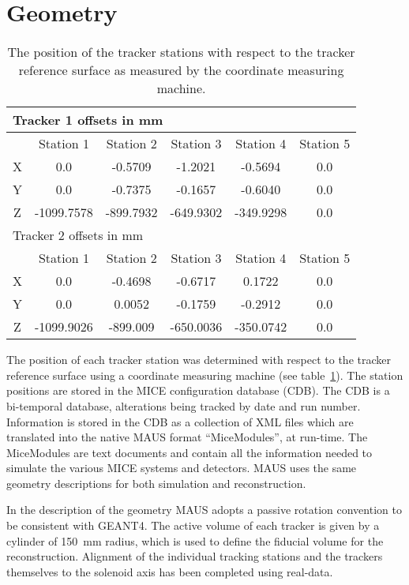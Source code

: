 \section{Geometry}
\label{sec:Geometry}
  
  \begin{table} [tbp]
  \begin{center}
  \begin{tabular} {|c|c|c|c|c|c|}
    \hline
    \multicolumn{6}{|l|}{Tracker 1 offsets in mm} \\
    \hline
    & Station 1 & Station 2 & Station 3 & Station 4 & Station 5 \\
    \hline
    X & 0.0 & -0.5709 & -1.2021 & -0.5694 & 0.0 \\
    Y & 0.0 & -0.7375 & -0.1657 & -0.6040 & 0.0 \\
    Z & -1099.7578 & -899.7932 & -649.9302 & -349.9298 & 0.0 \\
    \hline
    \hline
    \multicolumn{6}{|l|}{Tracker 2 offsets in mm} \\
    \hline
    & Station 1 & Station 2 & Station 3 & Station 4 & Station 5 \\
    \hline
    X & 0.0 & -0.4698 & -0.6717 & 0.1722 & 0.0 \\
    Y & 0.0 & 0.0052 & -0.1759 & -0.2912 & 0.0 \\
    Z & -1099.9026 & -899.009 & -650.0036 & -350.0742 & 0.0 \\
    \hline
  \end{tabular}
  \caption{\label{tab:CMM} The position of the tracker stations with respect to the tracker reference surface as measured by the coordinate measuring machine.}
  \end{center}
  \end{table}
  
  The position of each tracker station was determined with respect to the tracker reference surface using a coordinate measuring machine (see table~\ref{tab:CMM}). The station positions are stored in the MICE configuration database (CDB). The CDB is a bi-temporal database, alterations being tracked by date and run number. Information is stored in the CDB as a collection of XML files which are translated into the native MAUS format ``MiceModules'', at run-time.  The MiceModules are text documents and contain all the information needed to simulate the various MICE systems and detectors.  MAUS uses the same geometry descriptions for both simulation and reconstruction. 
  
  In the description of the geometry MAUS adopts a passive rotation convention to be consistent with GEANT4.  The active volume of each tracker is given by a cylinder of 150~mm radius, which is used to define the fiducial volume for the reconstruction. Alignment of the individual tracking stations and the trackers themselves to the solenoid axis has been completed using real-data.
  

